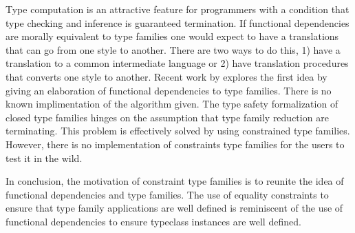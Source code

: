 \documentclass[format=sigplan,manuscript,review,screen,nonacm,margin=1in]{acmart}
\begin{document}

Type computation is an attractive feature for programmers with a condition that type checking and inference
is guaranteed termination. If functional dependencies are morally equivalent to type families
one would expect to have a translations that can go from one style to another.
There are two ways to do this, 1) have a translation to a common
intermediate language or 2) have translation procedures that converts one style to another. Recent work by
\citep{karachalias_elaboration_2017} explores the first idea by giving an elaboration of functional dependencies
to type families. There is no known implimentation of the algorithm given.
The type safety formalization of closed type families hinges on the assumption that
type family reduction are terminating. This problem is effectively solved by using constrained type families.
However, there is no implementation of constraints type families for the users to test it in the wild.

In conclusion, the motivation of constraint type families is to reunite
the idea of functional dependencies and type families.
The use of equality constraints to ensure that type family applications are well defined
is reminiscent of the use of functional dependencies to ensure typeclass instances are well defined.



\end{document}
